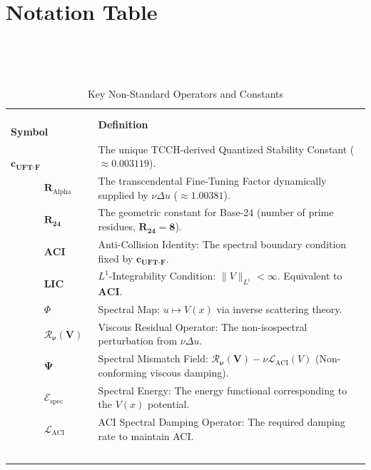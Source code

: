 \documentclass{article}
\begin{document}
\section{Notation Table}
\label{sec:notation}
\begin{table}[h]
    \centering
    \caption{Key Non-Standard Operators and Constants}
    \label{tab:notation}
    \begin{tabular}{@{}ll@{}}
        \toprule
        \textbf{Symbol} & \textbf{Definition} \\
        \midrule
        $\mathbf{c_{\text{UFT-F}}}$ & The unique TCCH-derived Quantized Stability Constant ($\approx 0.003119$). \\
        $\mathbf{R_{\mathrm{Alpha}}}$ & The transcendental Fine-Tuning Factor dynamically supplied by $\nu \Delta u$ ($\approx 1.00381$). \\
        $\mathbf{R_{24}}$ & The geometric constant for Base-24 (number of prime residues, $\mathbf{R_{24}=8}$). \\
        $\mathbf{ACI}$ & Anti-Collision Identity: The spectral boundary condition fixed by $\mathbf{c_{\text{UFT-F}}}$. \\
        $\mathbf{LIC}$ & $L^1$-Integrability Condition: $\|V\|_{L^1} < \infty$. Equivalent to $\mathbf{ACI}$. \\
        $\Phi$ & Spectral Map: $u \mapsto V(x)$ via inverse scattering theory. \\
        $\mathbf{\mathcal{R}_{\nu}(V)}$ & Viscous Residual Operator: The non-isospectral perturbation from $\nu \Delta u$. \\
        $\mathbf{\Psi}$ & Spectral Mismatch Field: $\mathbf{\mathcal{R}_{\nu}(V)} - \nu \mathcal{L}_{\text{ACI}}(V)$ (Non-conforming viscous damping). \\
        $\mathcal{E}_{\text{spec}}$ & Spectral Energy: The energy functional corresponding to the $V(x)$ potential. \\
        $\mathcal{L}_{\text{ACI}}$ & ACI Spectral Damping Operator: The required damping rate to maintain ACI. \\
        \bottomrule
    \end{tabular}
\end{table}

\end{document}
